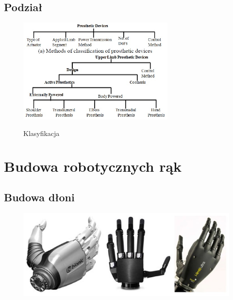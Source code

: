 \documentclass[8pt]{beamer}
\begin{document}
	\subsection{Podział}
		\begin{frame}
			\begin{center}
				\begin{figure}
					\includegraphics[width=0.7\textwidth]{graphics/classification.jpg}
					\label{graph:class}	
					\caption{Klasyfikacja \cite{bandara2012upper}}
				\end{figure}
			\end{center}
		\end{frame}							

\section{Budowa robotycznych rąk}

	\subsection{Budowa dłoni}
		\begin{frame}
			\begin{center}
				\begin{figure}
					\includegraphics[width=\textwidth]{graphics/three_hand.jpg}
					\label{graph:build}	
					\caption{ \cite{6361492}}
				\end{figure}
			\end{center}
		\end{frame}				
\end{document}
